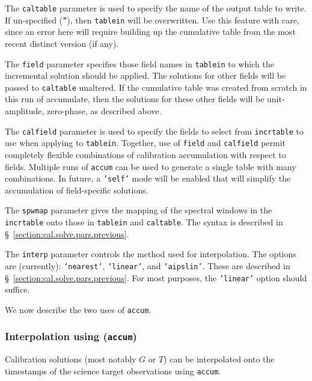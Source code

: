 The {\tt caltable} parameter is used to specify the name of the output
table to write. If un-specified ({\tt ''}), then {\tt tablein} will be
overwritten. Use this feature with care, since an error here will
require building up the cumulative table from the most recent distinct
version (if any).

The {\tt field} parameter specifies those field names in {\tt tablein} to
which the incremental solution should be applied. The solutions for
other fields will be passed to {\tt caltable} unaltered. If the cumulative
table was created from scratch in this run of accumulate, then the
solutions for these other fields will be unit-amplitude, zero-phase,
as described above.

The {\tt calfield} parameter is used to specify the fields to select
from {\tt incrtable} to use when applying to {\tt tablein}. Together,
use of {\tt field} and {\tt calfield} permit completely flexible combinations
of calibration accumulation with respect to fields. Multiple runs of
{\tt accum} can be used to generate a single table with many combinations.
In future, a {\tt 'self'} mode will be enabled that will simplify the
accumulation of field-specific solutions.

The {\tt spwmap} parameter gives the mapping of the spectral windows
in the {\tt incrtable} onto those in {\tt tablein} and {\tt caltable}.
The syntax is described in \S~\ref{section:cal.solve.pars.previous}.

The {\tt interp} parameter controls the method used for interpolation.
The options are (currently): {\tt 'nearest'}, {\tt 'linear'}, and
{\tt 'aipslin'}.
These are described in \S~\ref{section:cal.solve.pars.previous}.
For most purposes, the {\tt 'linear'} option should suffice.

We now describe the two uses of {\tt accum}.

\subsubsection{Interpolation using ({\tt accum})}
\label{section:cal.tables.accum.interp}

Calibration solutions (most notably $G$ or $T$) can be interpolated
onto the timestamps of the science target observations using {\tt accum}.  

